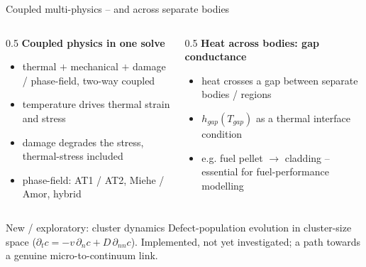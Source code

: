 \documentclass[aspectratio=169,11pt]{beamer}
\begin{document}
\begin{frame}{Coupled multi-physics -- and across separate bodies}
  \begin{columns}[T]
    \begin{column}{0.5\textwidth}
      \textbf{Coupled physics in one solve}
      \begin{itemize}
        \item thermal $+$ mechanical $+$ damage / phase-field, two-way coupled
        \item temperature drives thermal strain and stress
        \item damage degrades the stress, thermal-stress \alert{included}
        \item phase-field: AT1 / AT2, Miehe / Amor, hybrid
      \end{itemize}
    \end{column}
    \begin{column}{0.5\textwidth}
      \textbf{Heat across bodies: gap conductance}
      \begin{itemize}
        \item heat crosses a gap between \alert{separate bodies / regions}
        \item $h_{gap}(T_{gap})$ as a thermal interface condition
        \item e.g. fuel pellet $\to$ cladding -- essential for fuel-performance modelling
      \end{itemize}
    \end{column}
  \end{columns}
  \vspace{0.7em}
  \begin{block}{New / exploratory: cluster dynamics}
    \footnotesize
    Defect-population evolution in cluster-size space
    ($\partial_t c = -v\,\partial_n c + D\,\partial_{nn} c$). Implemented, not yet
    investigated; a path towards a genuine micro-to-continuum link.
  \end{block}
\end{frame}
\end{document}
